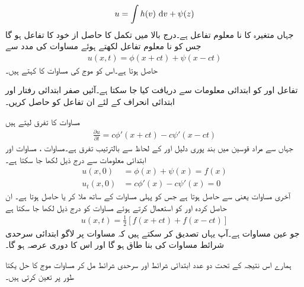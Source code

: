 \begin{align*}
u=\int h(v)\,\dif v+\psi(z)
\end{align*}
جہاں  متغیرہ  کا نا معلوم تفاعل ہے۔درج بالا میں تکمل کا حاصل از خود  کا تفاعل ہو گا جس کو نا معلوم تفاعل   لکھتے ہوئے مساوات  کی مدد سے 
\begin{align}\label{مساوات_جزوی_موج_مساوات_ت}
u(x,t)=\phi(x+ct)+\psi(x-ct)
\end{align}
حاصل ہوتا ہے۔اس کو موج کی مساوات  کا  کہتے ہیں۔

تفاعل  اور  کو ابتدائی معلومات سے دریافت کیا جا سکتا ہے۔آئیں صفر ابتدائی رفتار اور ابتدائی انحراف  کے لئے ان تفاعل کو حاصل کریں۔

مساوات  کا تفرق لیتے ہیں
\begin{align}\label{مساوات_جزوی_موج_مساوات_ٹ}
\frac{\partial u}{\partial t}=c\phi'(x+ct)-c\psi'(x-ct)
\end{align}
جہاں  سے مراد قوسین میں بند پوری دلیل  اور  کے لحاظ سے بالترتیب  تفرق ہے۔مساوات ، مساوات  اور ابتدائی معلومات سے درج ذیل لکھا جا سکتا ہے۔
\begin{align*}
u(x,0)&=\phi(x)+\psi(x)=f(x)\\
u_t(x,0)&=c\phi'(x)-c\psi'(x)=0
\end{align*} 
آخری مساوات یعنی  سے  حاصل ہوتا ہے  جس کو پہلی مساوات کے ساتھ ملا کر  یا  حاصل ہوتا ہے۔ ان حاصل کردہ  اور   کو استعمال کرتے ہوئے مساوات  کو درج ذیل لکھا جا سکتا ہے
\begin{align}\label{مساوات_جزوی_موج_مساوات_ث}
u(x,t)=\frac{1}{2}[f(x+ct)+f(x-ct)]
\end{align}
جو عین مساوات  ہے۔آپ یہاں تصدیق کر سکتے ہیں کہ مساوات  پر لاگو  ابتدائی سرحدی شرائط مساوات  کی بنا  طاق ہو گا اور اس کا دوری عرصہ  ہو گا۔

ہمارے اس نتیجہ کے تحت دو عدد ابتدائی شرائط اور سرحدی شرائط مل کر مساوات موج کا حل یکتا طور پر تعین کرتی ہیں۔ 


